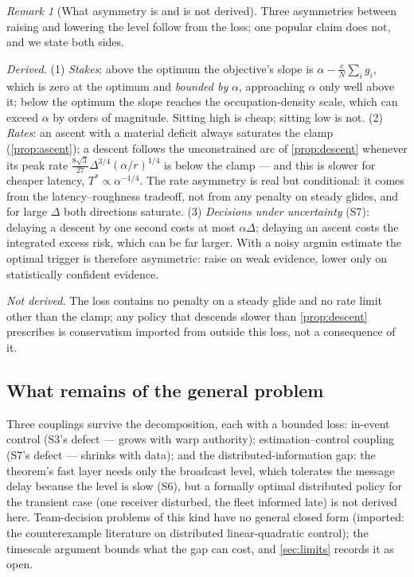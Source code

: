 \documentclass[11pt, a4paper]{article}
\theoremstyle{definition}
\theoremstyle{plain}
\theoremstyle{remark}
\newtheorem{remark}{Remark}[section]
\begin{document}
\begin{remark}[What asymmetry is and is not derived]
\label{rem:asymmetry}
Three asymmetries between raising and lowering the level follow from
the loss; one popular claim does not, and we state both sides.

\emph{Derived.}  (1) \emph{Stakes}: above the optimum the objective's
slope is $\alpha - \tfrac{c}{N}\sum_i g_i$, which is zero at the
optimum and \emph{bounded by} $\alpha$, approaching $\alpha$ only well
above it; below the optimum the slope reaches the occupation-density
scale, which can exceed $\alpha$ by orders of magnitude.  Sitting high
is cheap; sitting low is not.
(2) \emph{Rates}: an ascent with a material deficit always saturates
the clamp (\cref{prop:ascent}); a descent follows the unconstrained
arc of \cref{prop:descent} whenever its peak rate
$\tfrac{8\sqrt3}{27}\Delta^{3/4}(\alpha/r)^{1/4}$ is below the clamp
--- and this is slower for cheaper latency, $T^* \propto
\alpha^{-1/4}$.  The rate asymmetry is real but conditional: it comes
from the latency--roughness tradeoff, not from any penalty on steady
glides, and for large $\Delta$ both directions saturate.
(3) \emph{Decisions under uncertainty} (S7): delaying a descent by
one second costs at most $\alpha\Delta$; delaying an ascent costs the
integrated excess risk, which can be far larger.  With a noisy
argmin estimate the optimal trigger is therefore asymmetric: raise on
weak evidence, lower only on statistically confident evidence.

\emph{Not derived.}  The loss contains no penalty on a steady glide
and no rate limit other than the clamp; any policy that descends
slower than \cref{prop:descent} prescribes is conservatism imported
from outside this loss, not a consequence of it.
\end{remark}

\subsection{What remains of the general problem}\label{sec:residual}

Three couplings survive the decomposition, each with a bounded loss:
in-event control (S3's defect --- grows with warp authority);
estimation--control coupling (S7's defect --- shrinks with data); and
the distributed-information gap: the theorem's fast layer needs only
the broadcast level, which tolerates the message delay because the
level is slow (S6), but a formally optimal distributed policy for the
transient case (one receiver disturbed, the fleet informed late) is
not derived here.  Team-decision problems of this kind have no general
closed form (imported: the counterexample literature on distributed
linear-quadratic control); the timescale argument bounds what the gap
can cost, and \cref{sec:limits} records it as open.
\end{document}
